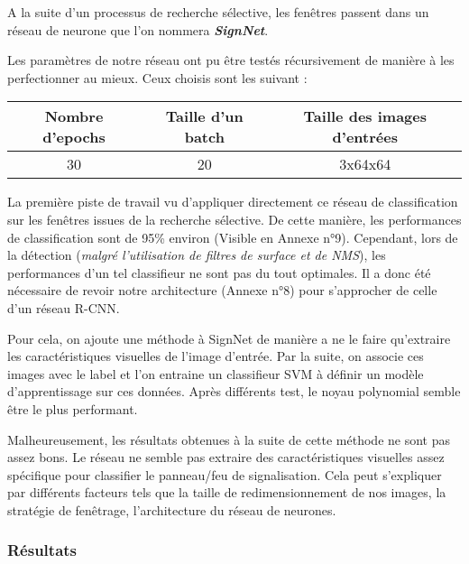 \documentclass[a4paper,11pt]{article}
\begin{document}
A la suite d'un processus de recherche sélective, les fenêtres passent dans un réseau de neurone que l'on nommera \textbf{\textit{SignNet}}.

\vspace{2mm}

\noindent Les paramètres de notre réseau ont pu être testés récursivement de manière à les perfectionner au mieux. Ceux choisis sont les suivant :

\begin{table}[h!]
    \centering
    \begin{tabular}{|c|c|c|}
        \hline
        \textbf{Nombre d'epochs} & \textbf{Taille d'un batch} &\textbf{Taille des images d'entrées} \\
        \hline
        30 & 20 & 3x64x64\\
        \hline
    \end{tabular}
\end{table}

La première piste de travail vu d'appliquer directement ce réseau de classification sur les fenêtres issues de la recherche sélective. De cette manière, les performances de classification sont de 95\% environ (Visible en Annexe n°9). Cependant, lors de la détection (\textit{malgré l'utilisation de filtres de surface et de NMS}), les performances d'un tel classifieur ne sont pas du tout optimales. Il a donc été nécessaire de revoir notre architecture (Annexe n°8) pour s'approcher de celle d'un réseau R-CNN.

\vspace{2mm}

Pour cela, on ajoute une méthode à SignNet de manière a ne le faire qu'extraire les caractéristiques visuelles de l'image d'entrée. Par la suite, on associe ces images avec le label et l'on entraine un classifieur SVM à définir un modèle d'apprentissage sur ces données. Après différents test, le noyau polynomial semble être le plus performant.

\vspace{2mm}

\noindent Malheureusement, les résultats obtenues à la suite de cette méthode ne sont pas assez bons. Le réseau ne semble pas extraire des caractéristiques visuelles assez spécifique pour classifier le panneau/feu de signalisation. Cela peut s'expliquer par différents facteurs tels que la taille de redimensionnement de nos images, la stratégie de fenêtrage, l'architecture du réseau de neurones. 

\subsubsection{Résultats}
\end{document}
